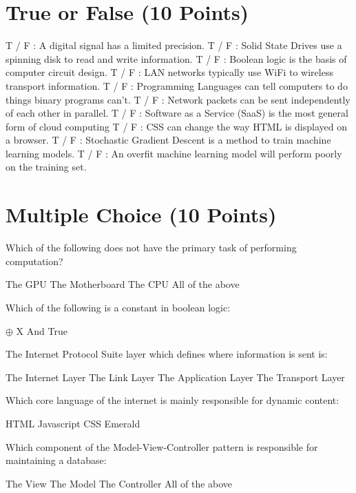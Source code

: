 \documentclass{exam}
\begin{document}
\begin{questions}
\section{True or False (10 Points)}
\question[1] T / F : A digital signal has a limited precision. 
\question[1] T / F : Solid State Drives use a spinning disk to read and write information.
\question[1] T / F : Boolean logic is the basis of computer circuit design.
\question[1] T / F : LAN networks typically use WiFi to wireless transport information.
\question[1] T / F : Programming Languages can tell computers to do things binary programs can't. 
\question[1] T / F : Network packets can be sent independently of each other in parallel.
\question[1] T / F : Software as a Service (SaaS) is the most general form of cloud computing
\question[1] T / F : CSS can change the way HTML is displayed on a browser.
\question[1] T / F : Stochastic Gradient Descent is a method to train machine learning models.
\question[1] T / F : An overfit machine learning model will perform poorly on the training set.

\section{Multiple Choice (10 Points)}
\question[1] Which of the following does not have the primary task of performing computation?
\begin{choices}
    \choice The GPU
    \choice The Motherboard
    \choice The CPU
    \choice All of the above
\end{choices}
\question[1] Which of the following is a constant in boolean logic:
\begin{choices}
    \choice $\oplus$
    \choice X
    \choice And
    \choice True
\end{choices}
\question[1] The Internet Protocol Suite layer which defines where information is sent is:
\begin{choices}
    \choice The Internet Layer
    \choice The Link Layer
    \choice The Application Layer
    \choice The Transport Layer
\end{choices}
\question[1] Which core language of the internet is mainly responsible for dynamic content:
\begin{choices}
    \choice HTML
    \choice Javascript
    \choice CSS
    \choice Emerald
\end{choices}

\newpage
\question[1] Which component of the Model-View-Controller pattern is responsible for maintaining a database: 
\begin{choices}
    \choice The View
    \choice The Model
    \choice The Controller
    \choice All of the above
\end{choices}


\end{questions}
\end{document}
